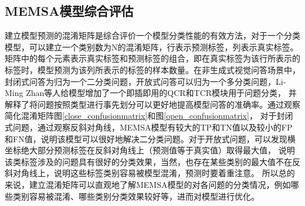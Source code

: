 \subsection{MEMSA模型综合评估}
建立模型预测的混淆矩阵是综合评价一个模型分类性能的有效方法，对于一个分类模型，可以建立一个类别数为N的混淆矩阵，行表示预测标签，列表示真实标签。
矩阵中的每个元素表示真实标签和预测标签的组合，即在真实标签为该行所表示的标签时，模型预测为该列所表示的标签的样本数量。在非生成式视觉问答场景中，
封闭式问答为归为一个二分类问题，开放式问答可以归为一个多分类问题，Li-Ming Zhan等人给模型增加了一个即插即用的QCR和TCR模块\cite{zhan2020medical}用于问题分类，
并解释了将问题按照类型进行事先划分可以更好地提高模型问答的准确率。通过观察简化混淆矩阵图\ref{close_confusionmatrix}和图\ref{open_confusionmatrix}，
对于封闭式问题，通过观察反斜对角线，MEMSA模型有较大的TP和TN值以及较小的FP和FN值，说明该模型可以很好地解决二分类问题。对于开放式问题，可以发现横坐标绝大部分预测标签在反斜对角线上（预测值等于真实值）取得最大值，
说明该类标签涉及的问题具有很好的分类效果，当然，也存在某些类别的最大值不在反斜对角线上，说明这些标签类别容易被模型混淆，预测时要着重注意。
所以总的来说，建立混淆矩阵可以直观地了解MEMSA模型的对各问题的分类情况，例如哪些类别容易被混淆、哪些类别分类效果较好等，进而对模型进行优化。


